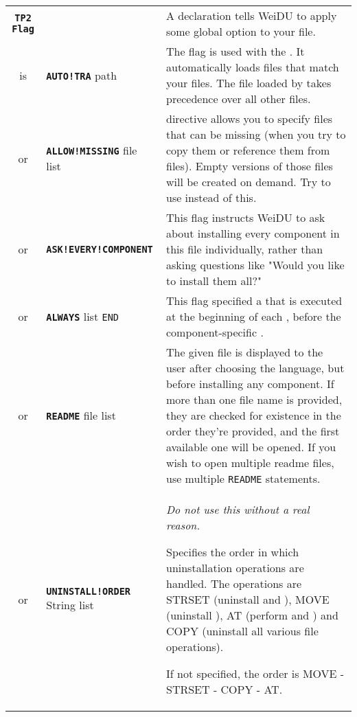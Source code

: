 \documentclass{article}
\def\ttref#1{\ahrefloc{#1}{\tt #1}}
\def\DEFINE#1{{\tt \bf #1}\label{#1}\index{#1}}
\def\DEFSYN#1{{\tt \bf #1}\index{#1}}
\def\t#1{{\tt #1}}
\def\Slist{{\color{red} list }}
\begin{document}
\begin{tabular}{cp{10in}|p{10in}}
\DEFINE{TP2 Flag} & & A \ttref{TP2 Flag} declaration tells WeiDU to apply some
global option to your \ttref{TP2} file. \\
  is & \DEFINE{AUTO!TRA} path &
       The \ttref{AUTO!TRA} flag is used
       with the \ttref{COMPILE} \ttref{TP2 Action}. It automatically loads
       \ttref{TRA} files that match your \ttref{D} files. The \ttref{TRA} file
       loaded by \ttref{AUTO!TRA} takes precedence over all other \ttref{TRA}
       files. \\
  or & \DEFINE{ALLOW!MISSING} file \Slist &
       \ttref{ALLOW!MISSING} directive allows you to specify files that can
       be missing (when you try to copy them or reference them from
       \ttref{D} files). Empty versions of those files will be created on
       demand. Try to use \ttref{ACTION!IF} instead of this. \\
  or & \DEFINE{ASK!EVERY!COMPONENT} &
       This flag instructs WeiDU to ask about installing every component in
       this \ttref{TP2} file individually, rather than asking questions
       like "Would you like to install them all?" \\
  or & \DEFINE{ALWAYS} \ttref{TP2 Action} \Slist \t{END} &
       This flag specified a \ttref{TP2 Action} that is executed at the beginning
       of each \ttref{Component}, before the component-specific \ttref{TP2 Action}.  \\
  or & \DEFINE{README} file \Slist &
       The given file is displayed to the user after choosing the language, but
       before installing any component. If more than one file name is provided,
       they are checked for existence in the order they're provided, and the first available
       one will be opened. If you wish to open multiple readme files, use multiple \t{README}
       statements.
  \\
  or & \DEFSYN{UNINSTALL!ORDER} String \Slist &
		\emph{Do not use this without a real reason.}

		Specifies the order in which uninstallation operations are handled.
		The operations are STRSET (uninstall \ttref{STRING!SET} and
                \ttref{ALTER!TLK}), MOVE
		(uninstall \ttref{MOVE}), AT (perform \ttref{AT!UNINSTALL} and
                \ttref{AT!INTERACTIVE!UNINSTALL}) and
		COPY (uninstall all various file operations).

		If not specified, the order is MOVE - STRSET - COPY - AT.


\end{tabular}
\end{document}
